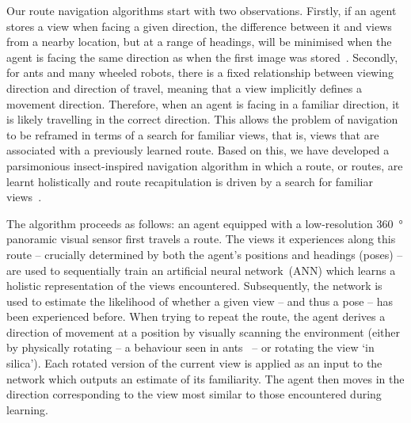 \documentclass[letterpaper]{article}
\begin{document}
Our route navigation algorithms start with two observations. 
Firstly, if an agent stores a view when facing a given direction, the difference between it and views from a nearby location, but at a range of headings, will be minimised when the agent is facing the same direction as when the first image was stored~\citep{Zeil2003}. 
Secondly, for ants and many wheeled robots, there is a fixed relationship between viewing direction and direction of travel, meaning that a view implicitly defines a movement direction.
Therefore, when an agent is facing in a familiar direction, it is likely travelling in the correct direction. 
This allows the problem of navigation to be reframed in terms of a search for familiar views, that is, views that are associated with a previously learned route.
Based on this, we have developed a parsimonious insect-inspired navigation algorithm in which a route, or routes, are learnt holistically and route recapitulation is driven by a search for familiar views~\citep{Baddeley2012}.

The algorithm proceeds as follows: an agent equipped with a low-resolution \SI{360}{\degree} panoramic visual sensor first travels a route.
The views it experiences along this route -- crucially determined by both the agent’s positions and headings (poses) -- are used to sequentially train an artificial neural network~(ANN) which learns a holistic representation of the views encountered. Subsequently, the network is used to estimate the likelihood of whether a given view -- and thus a pose -- has been experienced before.
When trying to repeat the route, the agent derives a direction of movement at a position by visually scanning the environment (either by physically rotating -- a behaviour seen in ants~\citep{Wystrach2014} -- or rotating the view `in silica').
Each rotated version of the current view is applied as an input to the network which outputs an estimate of its familiarity.
The agent then moves in the direction corresponding to the view most similar to those encountered during learning.
\end{document}
